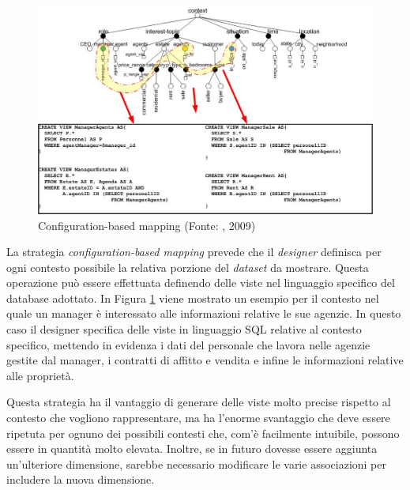 \begin{figure}[ht]
	\centering
	\includegraphics[width=\textwidth]{2-preliminari/Immagini/configuration-based-mapping.jpg}
	\caption[Configuration-based mapping]{Configuration-based mapping (Fonte: \cite{DBLP:journals/cacm/BolchiniCOQRST09}, 2009)}\label{fig:configuration-based-mapping}
\end{figure}

La strategia \emph{configuration-based mapping} prevede che il \emph{designer} definisca per ogni contesto possibile la relativa porzione del \emph{dataset} da mostrare. Questa operazione può essere effettuata definendo delle viste nel linguaggio specifico del database adottato. In Figura \ref{fig:configuration-based-mapping} viene mostrato un esempio per il contesto nel quale un manager è interessato alle informazioni relative le sue agenzie. In questo caso il designer specifica delle viste in linguaggio SQL relative al contesto specifico, mettendo in evidenza i dati del personale che lavora nelle agenzie gestite dal manager, i contratti di affitto e vendita e infine le informazioni relative alle proprietà.

Questa strategia ha il vantaggio di generare delle viste molto precise rispetto al contesto che vogliono rappresentare, ma ha l'enorme svantaggio che deve essere ripetuta per ognuno dei possibili contesti che, com'è facilmente intuibile, possono essere in quantità molto elevata. Inoltre, se in futuro dovesse essere aggiunta un'ulteriore dimensione, sarebbe necessario modificare le varie associazioni per includere la nuova dimensione.

